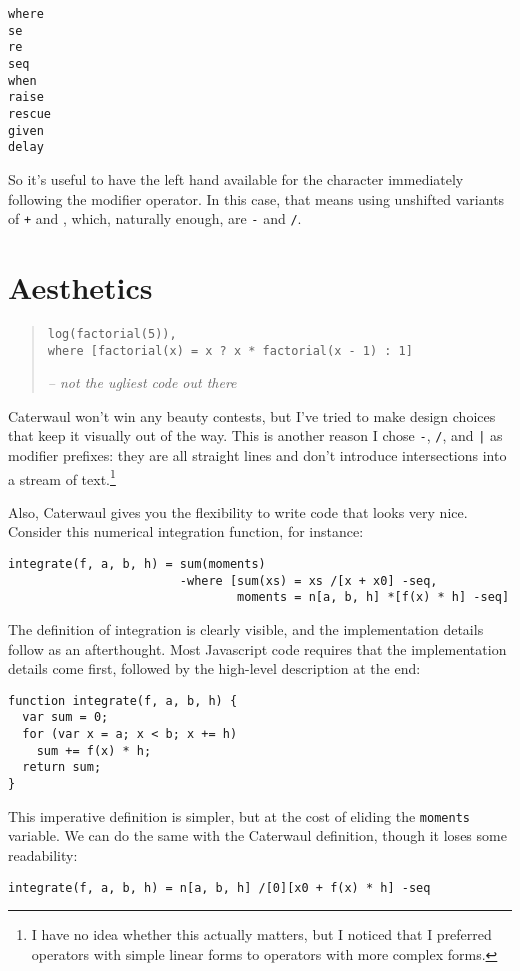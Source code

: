 \documentclass{report}
\begin{document}
\begin{verbatim}
where
se
re
seq
when
raise
rescue
given
delay
\end{verbatim}

    So it's useful to have the left hand available for the character immediately following the modifier operator. In this case, that means using unshifted variants of {\tt +} and {\tt *},
    which, naturally enough, are {\tt -} and {\tt /}.

\section{Aesthetics}
\begin{quote}
\begin{verbatim}
log(factorial(5)),
where [factorial(x) = x ? x * factorial(x - 1) : 1]
\end{verbatim}
\hfill \textit{-- not the ugliest code out there}
\end{quote}

    Caterwaul won't win any beauty contests, but I've tried to make design choices that keep it visually out of the way. This is another reason I chose {\tt -}, {\tt /}, and {\tt |} as
    modifier prefixes: they are all straight lines and don't introduce intersections into a stream of text.\footnote{I have no idea whether this actually matters, but I noticed that I
    preferred operators with simple linear forms to operators with more complex forms.}

    Also, Caterwaul gives you the flexibility to write code that looks very nice. Consider this numerical integration function, for instance:

\begin{verbatim}
integrate(f, a, b, h) = sum(moments)
                        -where [sum(xs) = xs /[x + x0] -seq,
                                moments = n[a, b, h] *[f(x) * h] -seq]
\end{verbatim}

    The definition of integration is clearly visible, and the implementation details follow as an afterthought. Most Javascript code requires that the implementation details come first,
    followed by the high-level description at the end:

\begin{verbatim}
function integrate(f, a, b, h) {
  var sum = 0;
  for (var x = a; x < b; x += h)
    sum += f(x) * h;
  return sum;
}
\end{verbatim}

    This imperative definition is simpler, but at the cost of eliding the {\tt moments} variable. We can do the same with the Caterwaul definition, though it loses some readability:

\begin{verbatim}
integrate(f, a, b, h) = n[a, b, h] /[0][x0 + f(x) * h] -seq
\end{verbatim}
\end{document}
